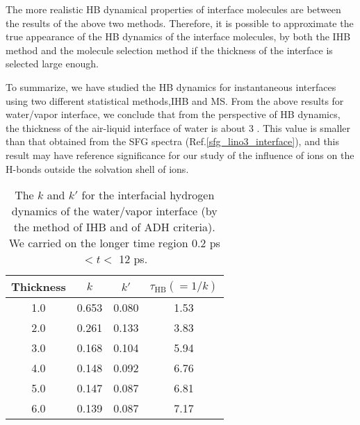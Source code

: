 {The more realistic HB dynamical properties of interface molecules are between the results of the above two methods. 
Therefore, it is possible to approximate the true appearance of the HB dynamics of the interface molecules, 
by both the IHB method and the molecule selection method if the thickness of the interface is selected large enough. 

To summarize, we have studied the HB dynamics for instantaneous interfaces using two different statistical methods,IHB and MS.
From the above results for water/vapor interface, we conclude that from the perspective of HB dynamics,
the thickness of the air-liquid interface of water is about 3 \A. This value is smaller than that obtained from the SFG spectra 
(Ref.\thinspace\ref{sfg_lino3_interface}), and this result may have reference significance for our study of the influence of ions on the H-bonds 
outside the solvation shell of ions. 
%
\begin{table}[htb]
\centering
\caption{\label{tab:k_k_prime_tau_128w_pure_ihb_ADH} 
    The $k$ and $k'$ for the interfacial hydrogen dynamics of the water/vapor interface (by the method of IHB and of ADH criteria). 
We carried on the longer time region 0.2 ps $< t <$ 12 ps. 
}
\begin{tabular}{cccc}
 Thickness & $k$ & $k'$ & $\tau_{\text{HB}} (=1/k)$ \\
\hline
  1.0 & 0.653 & 0.080 & 1.53  \\
  2.0 & 0.261 & 0.133 & 3.83  \\
  3.0 & 0.168 & 0.104 & 5.94  \\
  4.0 & 0.148 & 0.092 & 6.76  \\
  5.0 & 0.147 & 0.087 & 6.81  \\
  6.0 & 0.139 & 0.087 & 7.17  \\
\end{tabular}
\end{table}
\begin{table}[htb]

\end{table}}
